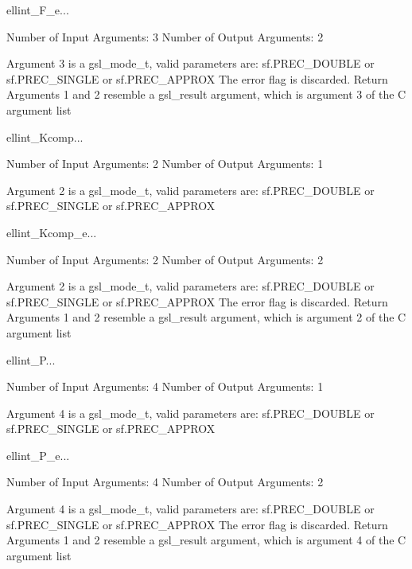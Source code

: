 \begin{funcdesc}{ellint_F_e}{...}

    Number of Input  Arguments:  3
    Number of Output Arguments:  2

 Argument 3 is a gsl_mode_t, valid parameters are:
	sf.PREC_DOUBLE or sf.PREC_SINGLE or sf.PREC_APPROX
The error flag is discarded.
Return Arguments 1 and 2 resemble a gsl_result argument,
	which is  argument 3 of the C argument list

\end{funcdesc}

\begin{funcdesc}{ellint_Kcomp}{...}

    Number of Input  Arguments:  2
    Number of Output Arguments:  1

 Argument 2 is a gsl_mode_t, valid parameters are:
	sf.PREC_DOUBLE or sf.PREC_SINGLE or sf.PREC_APPROX

\end{funcdesc}

\begin{funcdesc}{ellint_Kcomp_e}{...}

    Number of Input  Arguments:  2
    Number of Output Arguments:  2

 Argument 2 is a gsl_mode_t, valid parameters are:
	sf.PREC_DOUBLE or sf.PREC_SINGLE or sf.PREC_APPROX
The error flag is discarded.
Return Arguments 1 and 2 resemble a gsl_result argument,
	which is  argument 2 of the C argument list

\end{funcdesc}

\begin{funcdesc}{ellint_P}{...}

    Number of Input  Arguments:  4
    Number of Output Arguments:  1

 Argument 4 is a gsl_mode_t, valid parameters are:
	sf.PREC_DOUBLE or sf.PREC_SINGLE or sf.PREC_APPROX

\end{funcdesc}

\begin{funcdesc}{ellint_P_e}{...}

    Number of Input  Arguments:  4
    Number of Output Arguments:  2

 Argument 4 is a gsl_mode_t, valid parameters are:
	sf.PREC_DOUBLE or sf.PREC_SINGLE or sf.PREC_APPROX
The error flag is discarded.
Return Arguments 1 and 2 resemble a gsl_result argument,
	which is  argument 4 of the C argument list

\end{funcdesc}

